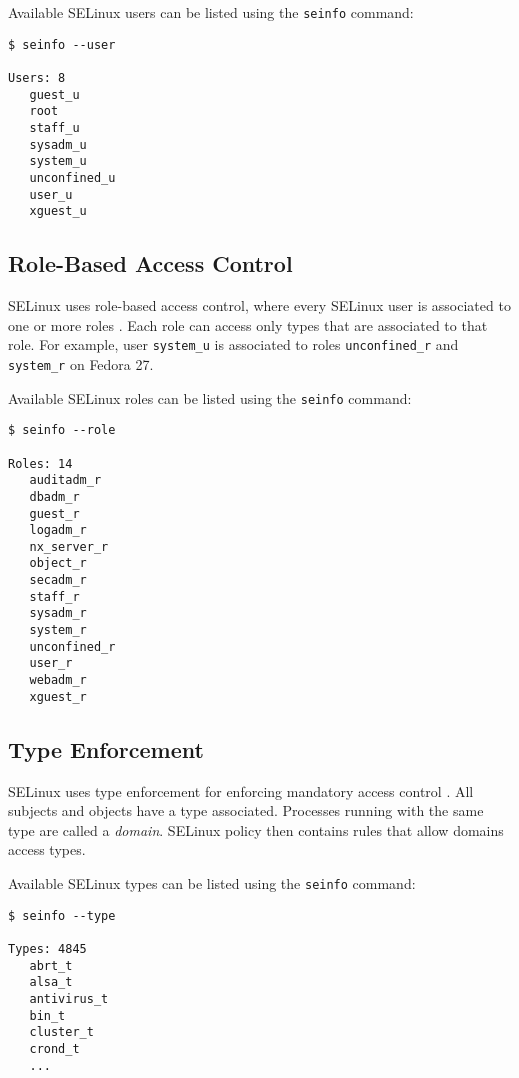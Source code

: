 Available SELinux users can be listed using the \texttt{seinfo} command:
\begin{lstlisting}
$ seinfo --user

Users: 8
   guest_u
   root
   staff_u
   sysadm_u
   system_u
   unconfined_u
   user_u
   xguest_u
\end{lstlisting}

\subsection{Role-Based Access Control}
\label{rbac}
SELinux uses role-based access control, where every SELinux user is associated
to one or more roles \cite[p.~24]{tsn}. Each role can access only types
that are associated to that role. For example, user \texttt{system\_u} is
associated to roles \texttt{unconfined\_r} and \texttt{system\_r} on Fedora 27.

Available SELinux roles can be listed using the \texttt{seinfo} command:
\begin{lstlisting}
$ seinfo --role

Roles: 14
   auditadm_r
   dbadm_r
   guest_r
   logadm_r
   nx_server_r
   object_r
   secadm_r
   staff_r
   sysadm_r
   system_r
   unconfined_r
   user_r
   webadm_r
   xguest_r
\end{lstlisting}

\subsection{Type Enforcement}
\label{te}
SELinux uses type enforcement for enforcing mandatory access control
\cite[pp.~25--26]{tsn}. All subjects and objects have a type associated.
Processes running with the same type are called a \emph{domain}. SELinux
policy then contains rules that allow domains access types.

Available SELinux types can be listed using the \texttt{seinfo} command:
\begin{lstlisting}
$ seinfo --type

Types: 4845
   abrt_t
   alsa_t
   antivirus_t
   bin_t
   cluster_t
   crond_t
   ...
\end{lstlisting}

